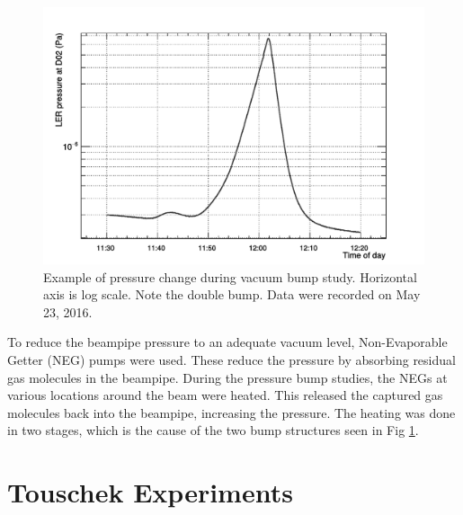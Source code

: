 \begin{figure}[htb]
	\centerfloat
		\includegraphics[trim={0 0 0 0.75cm},clip, width=\textwidth]{images/PressureBump}
	\caption[Example of pressure change during vacuum bump study]{Example of pressure change during vacuum bump study. Horizontal axis is log scale. Note the double bump. Data were recorded on May 23, 2016.}	
	\label{fig:VacuumBumpEg}
\end{figure}


	To reduce the beampipe pressure to an adequate vacuum level, Non-Evaporable Getter (NEG) pumps were used. These reduce the pressure by absorbing residual gas molecules in the beampipe. During the pressure bump studies, the NEGs at various locations around the beam were heated. This released the captured gas molecules back into the beampipe, increasing the pressure. The heating was done in two stages, which is the cause of the two bump structures seen in Fig \ref{fig:VacuumBumpEg}. 


\section{Touschek Experiments}



